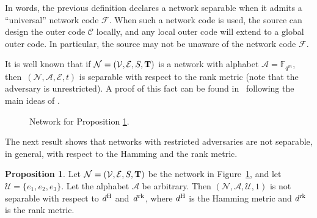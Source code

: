 \documentclass[11pt,a4paper]{article}
\theoremstyle{definition}
\newtheorem{proposition}[theorem]{Proposition}
\newcommand{\numberset}{\mathds}
\newcommand{\F}{\numberset{F}}
\newcommand{\mC}{\mathcal{C}}
\newcommand{\mA}{\mathcal{A}}
\newcommand{\mN}{\mathcal{N}}
\newcommand{\mF}{\mathcal{F}}
\newcommand{\mU}{\mathcal{U}}
\newcommand{\dH}{d^\textnormal{H}}
\newcommand{\drk}{d^\textnormal{rk}}
\newcommand{\mE}{\mathcal{E}}
\newcommand{\mV}{\mathcal{V}}
\newcommand{\bfT}{\bf T}
\newlength{\mynodespace}
\begin{document}
In words, the previous definition declares a network separable when it admits a ``universal'' network code $\mF$. When such a network code is used, the source can design the outer code $\mC$ locally, and any local outer code will extend to a global outer code. In particular, the source may not be unaware of the network code $\mF$.


It is well known that if
$\mN=(\mV,\mE, S, \bfT)$ is a network with alphabet $\mA=\F_{q^m}$, then~$(\mN,\mA,\mE,t)$ is separable with respect to the rank metric (note that the adversary is unrestricted).
A proof of this fact can be found in~\cite{dikaliotis2011multiple} following the main ideas of \cite{silva2008rank}. 

\begin{figure}[h!]
\centering

\caption{Network for Proposition \ref{prop:restr}.\label{easyex}}
\end{figure}




The next result shows that networks with 
restricted adversaries
are not separable, in general, with respect to the Hamming and the rank metric. 

\begin{proposition} \label{prop:restr}
    Let $\mN=(\mV,\mE, S, \bfT)$ be the network in Figure~\ref{easyex}, and let $\mU=\{e_1,e_2,e_3\}$. Let the alphabet $\mA$ be arbitrary. Then $(\mN,\mA,\mU,1)$ is not separable with respect to $\dH$ and~$\drk$, where $\dH$ is the Hamming metric and $\drk$ is the rank metric.
\end{proposition}
\end{document}
